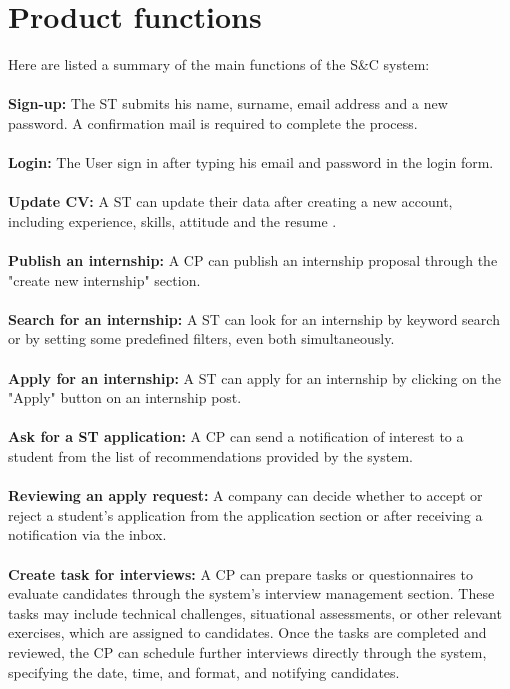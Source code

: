 \section{Product functions}
\label{sec:product_functions}%
Here are listed a summary of the main functions of the S\&C system:\\\\
\textbf{ Sign-up:} The ST submits his name, surname, email address and a new password. A confirmation mail is required to complete the process.\\\\
\textbf{ Login:} The User sign in after typing his email and password in the login form. \\\\  
\textbf{ Update CV:} A ST can update their data after creating a new account, including experience, skills, attitude and the resume .\\\\
\textbf{ Publish an internship:} A CP can publish an internship proposal through  the "create new internship" section.\\\\
\textbf{ Search for an internship:} A ST can look for an internship by keyword search or by setting some predefined filters, even both simultaneously.\\\\
\textbf{ Apply for an internship:} A ST can apply for an internship by clicking on the "Apply" button on an internship post.\\\\
\textbf{ Ask for a ST application: } A CP can send a notification of interest to a student from the list of recommendations provided by the system.\\\\
\textbf{ Reviewing an apply request:} A company can decide whether to accept or reject a student's application from the application section or after receiving a notification via the inbox.\\\\
\textbf{ Create task for interviews:}  A CP can prepare tasks or questionnaires to evaluate candidates through the system's interview management section. These tasks may include technical challenges, situational assessments, or other relevant exercises, which are assigned to candidates. Once the tasks are completed and reviewed, the CP can schedule further interviews directly through the system, specifying the date, time, and format, and notifying candidates. \\\\
